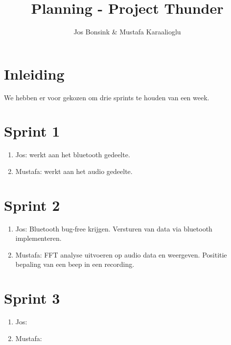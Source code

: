 \documentclass[12pt]{article}
\author{Jos Bonsink \& Mustafa Karaalioglu}
\begin{document}
\title{Planning - Project Thunder}
\maketitle

\section*{Inleiding}
We hebben er voor gekozen om drie sprints te houden van een week.

\section*{Sprint 1}
\begin{enumerate}
\item Jos: werkt aan het bluetooth gedeelte.
\item Mustafa: werkt aan het audio gedeelte.
\end{enumerate}

\section*{Sprint 2}
\begin{enumerate}
\item Jos: Bluetooth bug-free krijgen. Versturen van data via bluetooth implementeren.
\item Mustafa: FFT analyse uitvoeren op audio data en weergeven. Posititie bepaling van een beep in een recording.
\end{enumerate}

\section*{Sprint 3}
\begin{enumerate}
\item Jos:
\item Mustafa:
\end{enumerate}
\end{document}
